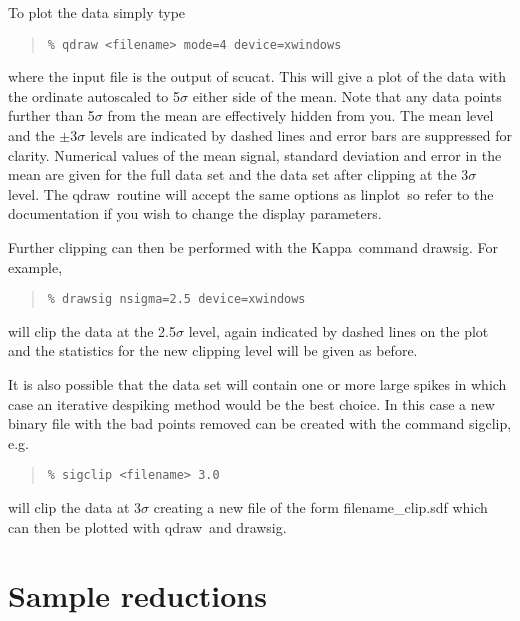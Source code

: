 \documentclass[twoside,11pt,fleqn]{article}
\newenvironment{myquote}{\begin{quote}\begin{small}}{\end{small}\end{quote}}
\newcommand{\Kappa}{\xref{{\sc Kappa}}{sun95}{}}
\newcommand{\task}[1]{{\sf #1}}
\newcommand{\scucat}{\xref{\task{scucat}}{sun216}{SCUCAT}}
\newcommand{\qdraw}{\xref{\task{qdraw}}{sun216}{QDRAW}}
\newcommand{\sigclip}{\xref{\task{sigclip}}{sun216}{SIGCLIP}}
\newcommand{\linplot}{\xref{\task{linplot}}{sun95}{LINPLOT}}
\newcommand{\drawsig}{\xref{\task{drawsig}}{sun95}{DRAWSIG}}
\newcommand{\xref}[3]{#1}
\begin{document}
To plot the data simply type

\begin{myquote}
\begin{verbatim}
% qdraw <filename> mode=4 device=xwindows
\end{verbatim}
\end{myquote}

where the input file is the output of \scucat. This will give a
plot of the data with the ordinate autoscaled to 5$\sigma$ either side
of the mean. Note that any data points further than 5$\sigma$ from the
mean are effectively hidden from you. The mean level and the
$\pm$3$\sigma$ levels are indicated by dashed lines and error bars are
suppressed for clarity. Numerical values of the mean signal, standard
deviation and error in the mean are given for the full data set and
the data set after clipping at the 3$\sigma$ level. The \qdraw\
routine will accept the same options as \linplot\ so refer to the
documentation if you wish to change the display parameters.

Further clipping can then be performed with the \Kappa\ command 
\drawsig. For example,

\begin{myquote}
\begin{verbatim}
% drawsig nsigma=2.5 device=xwindows
\end{verbatim}
\end{myquote}

will clip the data at the 2.5$\sigma$ level, again indicated by
dashed lines on the plot and the statistics for the new clipping level
will be given as before.

It is also possible that the data set will contain one or more large
spikes in which case an iterative despiking method would be the best
choice. In this case a new binary file with the bad points removed can
be created with the command \sigclip, e.g.

\begin{myquote}
\begin{verbatim}
% sigclip <filename> 3.0
\end{verbatim}
\end{myquote}

will clip the data at 3$\sigma$ creating a new file of the form
filename\_clip.sdf which can then be plotted with \qdraw\ and
\drawsig.

\section{Sample reductions}
\end{document}

